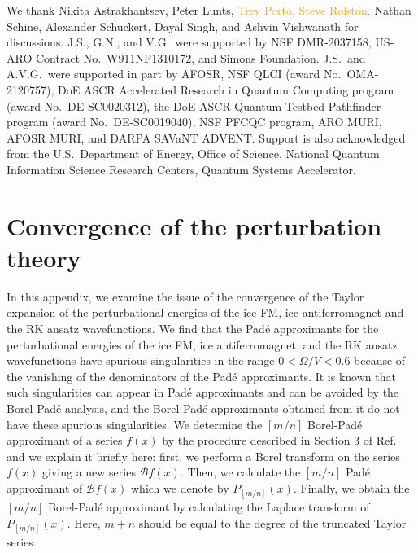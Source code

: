 \documentclass[twocolumn,superscriptaddress,amsmath,amssymb,aps,prx,nofootinbib]{revtex4-2}
\newcommand{\addtext}[1]{\textcolor{orange}{#1}}
\begin{document}
\begin{acknowledgments}
We thank Nikita Astrakhantsev, Peter Lunts, \addtext{Trey Porto, Steve Rolston,} Nathan Schine, Alexander Schuckert, Dayal Singh, and Ashvin Vishwanath for discussions. J.S., G.N., and V.G.~were  supported by NSF DMR-2037158, US-ARO Contract No.~W911NF1310172, and Simons Foundation. J.S.~and A.V.G.~were supported in part by AFOSR, NSF QLCI (award No.~OMA-2120757), DoE ASCR Accelerated Research in Quantum Computing program (award No.~DE-SC0020312), the DoE ASCR Quantum Testbed Pathfinder program (award No.~DE-SC0019040), NSF PFCQC program, ARO MURI, AFOSR MURI, and DARPA SAVaNT ADVENT. Support is also acknowledged from the U.S.~Department of Energy, Office of Science, National Quantum Information Science Research Centers, Quantum Systems Accelerator.  

\end{acknowledgments}



\appendix

\section{Convergence of the perturbation theory}\label{app:perturbation}

In this appendix, we examine the issue of the convergence of the Taylor expansion of the perturbational energies of the ice FM, ice antiferromagnet and the RK ansatz wavefunctions. 
We find that the Pad\'e approximants for the perturbational energies of the ice FM, ice antiferromagnet, and the RK ansatz wavefunctions  have spurious singularities in the range $0 < \Omega/V < 0.6$ because of the vanishing of the denominators of the Pad\'e approximants. 
It is known that such singularities can appear in Pad\'e approximants and can be avoided by the Borel-Pad\'e analysis, and the Borel-Pad\'e approximants obtained from it do not have these spurious singularities. 
We determine the $[m/n]$ Borel-Pad\'e approximant of a series $f(x)$ by the procedure described in Section 3 of Ref.~\cite{deeb2016comparison} and we explain it briefly here: first, we perform a Borel transform on the series $f(x)$ giving a new series $\mathcal{B}f(x)$. Then, we calculate the $[m/n]$ Pad\'e approximant of $\mathcal{B}f(x)$ which we denote by $P_{[m/n]}(x)$. 
Finally, we obtain the $[m/n]$ Borel-Pad\'e approximant by calculating the Laplace transform of $P_{[m/n]}(x)$.
Here, $m+n$ should be equal to the degree of the truncated Taylor series. 
\end{document}
